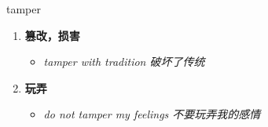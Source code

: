 
\begin{frame}
{\huge tamper}
\begin{center}
\begin{enumerate}\Large
  \item \textbf{篡改，损害}
  \begin{itemize}
    \item \em{\Large{tamper with tradition 破坏了传统}}
  \end{itemize}
  \item \textbf{玩弄}
  \begin{itemize}
    \item \em{\Large{do not tamper my feelings 不要玩弄我的感情}}
  \end{itemize}
\end{enumerate}
\end{center}
\end{frame}
